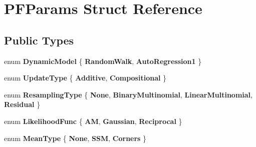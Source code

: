 \hypertarget{structPFParams}{\section{P\-F\-Params Struct Reference}
\label{structPFParams}
}
\subsection*{Public Types}
\begin{DoxyCompactItemize}
\item 
enum {\bfseries Dynamic\-Model} \{ {\bfseries Random\-Walk}, 
{\bfseries Auto\-Regression1}
 \}
\item 
enum {\bfseries Update\-Type} \{ {\bfseries Additive}, 
{\bfseries Compositional}
 \}
\item 
enum {\bfseries Resampling\-Type} \{ {\bfseries None}, 
{\bfseries Binary\-Multinomial}, 
{\bfseries Linear\-Multinomial}, 
{\bfseries Residual}
 \}
\item 
enum {\bfseries Likelihood\-Func} \{ {\bfseries A\-M}, 
{\bfseries Gaussian}, 
{\bfseries Reciprocal}
 \}
\item 
enum {\bfseries Mean\-Type} \{ {\bfseries None}, 
{\bfseries S\-S\-M}, 
{\bfseries Corners}
 \}
\end{DoxyCompactItemize}
